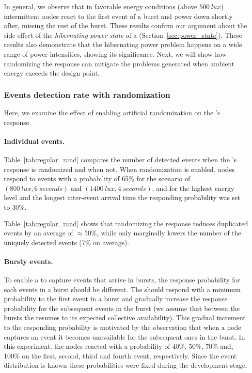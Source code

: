 In general, we observe that in favorable energy conditions (above $\SI{500}{lux}$) intermittent nodes react to the first event of a burst and power down shortly after, missing the rest of the burst. These results confirm our argument about the side effect of the \textit{hibernating power state} of a \cis (Section~\ref{sec:power_state}). These results also demonstrate that the hibernating power problem happens on a wide range of power intensities, showing its significance. Next, we will show how randomizing the response can mitigate the problems generated when ambient energy exceeds the design point. 
%
\subsubsection{Events detection rate with randomization}
Here, we examine the effect of enabling artificial randomization on the \cis's response. 
%
\paragraph{Individual events.} 
Table~\ref{tab:regular_rand} compares the number of detected events when the
\cim's response is randomized and when not.
When randomization is enabled, nodes respond to events with a probability of 65\% for the scenario of $\left(\SI{800}{lux}, \SI{6}{seconds}\right)$ and $\left(\SI{1400}{lux}, \SI{4}{seconds}\right)$, and for the highest energy level and the longest inter-event arrival time the responding probability was set to 30\%.

Table~\ref{tab:regular_rand} shows that randomizing the response reduces duplicated events by an average of $\approx$50\%, while only marginally lowers the number of the uniquely detected events (7\% on average). 
%
\paragraph{Bursty events.}
To enable a \cis to capture events that arrive in bursts, the response probability for each events in a burst should be different. The \cis should respond with a minimum probability to the first event in a burst and gradually increase the response probability for the subsequent events in the burst (we assume that between the bursts the \cis resumes to its expected collective availability). This gradual increment to the responding probability is motivated by the observation that when a node captures an event it becomes unavailable for the subsequent ones in the burst.
In this experiment, the nodes reacted with a probability of 40\%, 50\%, 70\% and, 100\% on the first, second, third and fourth event, respectively. Since the event distribution is known these probabilities were fixed during the development stage.


